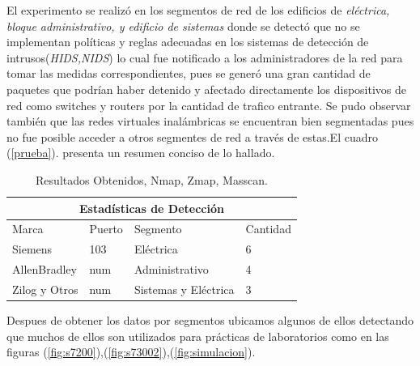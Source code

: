 \documentclass[jou,apacite]{apa6}   %
\begin{document}
El experimento se realizó en los segmentos de red de los edificios de \textit{eléctrica, bloque administrativo, y edificio de sistemas} donde se detectó que no se implementan políticas y reglas adecuadas en los sistemas de detección de intrusos(\textit{HIDS,NIDS}) lo cual fue notificado a los administradores de la red para tomar las medidas correspondientes, pues se generó una gran cantidad de paquetes que podrían haber detenido y afectado directamente los dispositivos de red como switches y routers por la cantidad de trafico entrante. Se pudo observar también que las redes virtuales inalámbricas se encuentran bien segmentadas pues no fue posible acceder a otros segmentes de red a través de estas.El cuadro (\ref{prueba}).  presenta un resumen conciso de lo hallado.

\begin{table}[htb]
\centering
\begin{tabular}{| p{1.8cm}| p{1.1cm} |p{1.9cm}|p{1.2cm}|}
\hline
\multicolumn{4}{|c|}{Estadísticas de Detección} \\
\hline
Marca & Puerto & Segmento & Cantidad\\
\hline 
Siemens & 103 & Eléctrica & 6\\ \hline
AllenBradley & num  & Administrativo & 4\\ \hline
Zilog y Otros & num  & Sistemas y Eléctrica & 3 \\ \hline
\end{tabular}
\caption{Resultados Obtenidos, Nmap, Zmap, Masscan.}
\label{fig:prueba}
\end{table}
Despues de obtener los datos por segmentos ubicamos algunos de ellos detectando que muchos de ellos son utilizados para prácticas de laboratorios como en las figuras  (\ref{fig:s7200}),(\ref{fig:s73002}),(\ref{fig:simulacion}).
\end{document}
